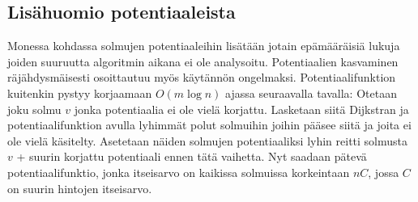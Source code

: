 \documentclass[a4paper, 11pt]{article}
\begin{document}
\subsection*{Lisähuomio potentiaaleista}
Monessa kohdassa solmujen potentiaaleihin lisätään jotain epämääräisiä lukuja joiden suuruutta
algoritmin aikana ei ole analysoitu. Potentiaalien kasvaminen räjähdysmäisesti osoittautuu
myös käytännön ongelmaksi. Potentiaalifunktion kuitenkin pystyy korjaamaan $O(m \log n)$ ajassa
seuraavalla tavalla: Otetaan joku solmu $v$ jonka potentiaalia ei ole vielä korjattu. Lasketaan siitä
Dijkstran ja potentiaalifunktion avulla lyhimmät polut solmuihin joihin pääsee siitä ja joita ei ole
vielä käsitelty. Asetetaan näiden solmujen potentiaaliksi lyhin reitti solmusta $v$ + 
suurin korjattu potentiaali ennen tätä vaihetta. Nyt saadaan pätevä potentiaalifunktio, jonka
itseisarvo on kaikissa solmuissa korkeintaan $nC$, jossa $C$ on suurin hintojen itseisarvo.
\end{document}
